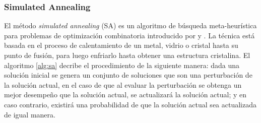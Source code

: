 \subsubsection{Simulated Annealing}
El método {\em simulated annealing} (SA) es un algoritmo de búsqueda meta-heurística para problemas de optimización combinatoria introducido por \cite{Kirkpatrick1983} y \cite{Cerny1985}. La técnica está basada en el proceso de calentamiento de un metal, vidrio o cristal hasta su punto de fusión, para luego enfriarlo hasta obtener una estructura cristalina. El algoritmo \ref{alg:sa} decribe el procedimiento de la siguiente manera: dada una solución inicial se genera un conjunto de soluciones que son una perturbación de la solución actual, en el caso de que al evaluar la perturbación se obtenga un mejor desempeño que la solución actual, se actualizará la solución actual; y en caso contrario, existirá una probabilidad de que la solución actual sea actualizada de igual manera.






